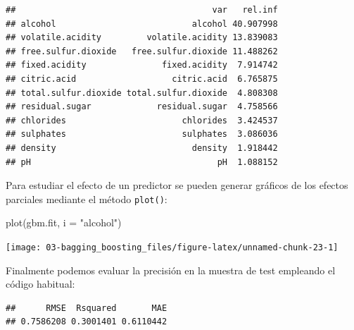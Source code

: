 \documentclass[
]{book}
\newenvironment{Shaded}{\begin{snugshade}}{\end{snugshade}}
\newcommand{\AttributeTok}[1]{\textcolor[rgb]{0.77,0.63,0.00}{#1}}
\newcommand{\CommentTok}[1]{\textcolor[rgb]{0.56,0.35,0.01}{\textit{#1}}}
\newcommand{\FunctionTok}[1]{\textcolor[rgb]{0.00,0.00,0.00}{#1}}
\newcommand{\NormalTok}[1]{#1}
\newcommand{\OtherTok}[1]{\textcolor[rgb]{0.56,0.35,0.01}{#1}}
\newcommand{\SpecialCharTok}[1]{\textcolor[rgb]{0.00,0.00,0.00}{#1}}
\newcommand{\StringTok}[1]{\textcolor[rgb]{0.31,0.60,0.02}{#1}}
\theoremstyle{break}
\theoremstyle{definition}
\theoremstyle{definition}
\theoremstyle{definition}
\theoremstyle{definition}
\theoremstyle{remark}
\begin{document}
\begin{verbatim}
##                                       var   rel.inf
## alcohol                           alcohol 40.907998
## volatile.acidity         volatile.acidity 13.839083
## free.sulfur.dioxide   free.sulfur.dioxide 11.488262
## fixed.acidity               fixed.acidity  7.914742
## citric.acid                   citric.acid  6.765875
## total.sulfur.dioxide total.sulfur.dioxide  4.808308
## residual.sugar             residual.sugar  4.758566
## chlorides                       chlorides  3.424537
## sulphates                       sulphates  3.086036
## density                           density  1.918442
## pH                                     pH  1.088152
\end{verbatim}

Para estudiar el efecto de un predictor se pueden generar gráficos de los efectos parciales mediante el método \texttt{plot()}:

\begin{Shaded}
\begin{Highlighting}[]
\FunctionTok{plot}\NormalTok{(gbm.fit, }\AttributeTok{i =} \StringTok{"alcohol"}\NormalTok{)}
\end{Highlighting}
\end{Shaded}

\begin{center}\texttt{[image: 03-bagging\_boosting\_files/figure-latex/unnamed-chunk-23-1]} \end{center}

Finalmente podemos evaluar la precisión en la muestra de test empleando el código habitual:

\begin{Shaded}
\end{Shaded}

\begin{verbatim}
##      RMSE  Rsquared       MAE 
## 0.7586208 0.3001401 0.6110442
\end{verbatim}
\end{document}
